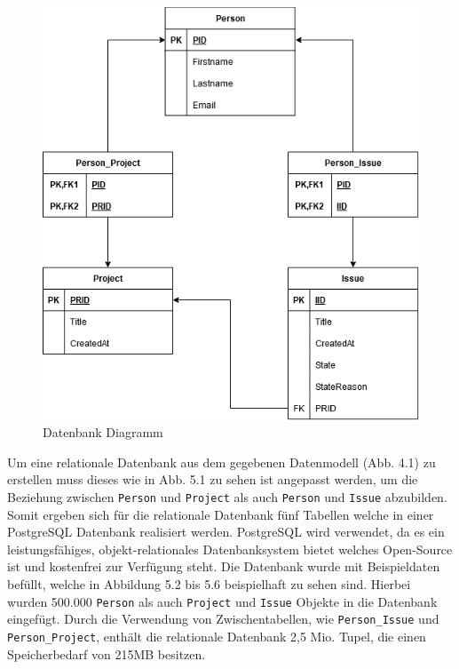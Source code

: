 \begin{figure}[H]
	\centering
	\includegraphics[scale=0.6]{Illustrations/table_diagram.png}
	\caption{Datenbank Diagramm}
\end{figure}
\newpage
\noindent
Um eine relationale Datenbank aus dem gegebenen Datenmodell (Abb. 4.1) zu erstellen muss dieses wie in Abb. 5.1 zu sehen ist angepasst werden, um die Beziehung zwischen \texttt{Person} und \texttt{Project} als auch \texttt{Person} und \texttt{Issue} abzubilden. Somit ergeben sich für die relationale Datenbank fünf Tabellen welche in einer PostgreSQL Datenbank realisiert werden. PostgreSQL wird verwendet, da es ein leistungsfähiges, objekt-relationales Datenbanksystem bietet welches Open-Source ist und kostenfrei zur Verfügung steht. Die Datenbank wurde mit Beispieldaten befüllt, welche in Abbildung 5.2 bis 5.6 beispielhaft zu sehen sind. Hierbei wurden 500.000 \texttt{Person} als auch \texttt{Project} und \texttt{Issue} Objekte in die Datenbank eingefügt. Durch die Verwendung von Zwischentabellen, wie \texttt{Person\_Issue} und \texttt{Person\_Project}, enthält die relationale Datenbank 2,5 Mio. Tupel, die einen Speicherbedarf von 215MB besitzen. 

